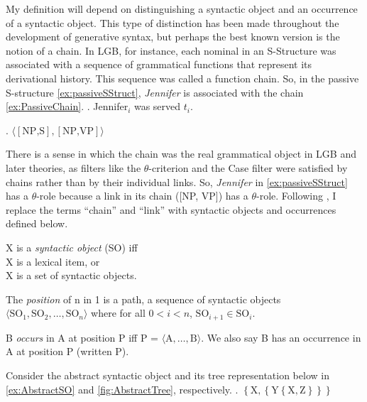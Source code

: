 \documentclass[MilwayThesis]{subfiles}
\begin{document}
My definition will depend on distinguishing a syntactic object and an occurrence of a syntactic object.
This type of distinction has been made throughout the development of generative syntax, but perhaps the best known version is the notion of a chain.
In LGB, for instance, each nominal in an S-Structure was associated with a sequence of grammatical functions that represent its derivational history.
This sequence was called a function chain.
So, in the passive S-structure \cref{ex:passiveSStruct}, \textit{Jennifer} is associated with the chain \cref{ex:PassiveChain}.
\ex.\label{ex:passiveSStruct} Jennifer$_i$ was served $t_i$.

\ex.\label{ex:PassiveChain} $\langle\left[\text{NP,S}\right], \left[\text{NP,VP}\right]\rangle$

There is a sense in which the chain was the real grammatical object in LGB and later theories, as filters like the $\theta$-criterion and the Case filter were satisfied by chains rather than by their individual links.
So, \textit{Jennifer} in \cref{ex:passiveSStruct} has a $\theta$-role because a link in its chain ([NP, VP]) has a $\theta$-role.
Following \textcite{collins2016formalization}, I replace the terms ``chain'' and ``link'' with syntactic objects and occurrences defined below.
\begin{defn}
  X is a \textit{syntactic object} (SO) iff\\
    X is a lexical item, or\\
    X is a set of syntactic objects. \parencite[Modified from][]{collins2016formalization}
  \label{def:so}
\end{defn}
\begin{defn}
  The \textit{position} of n in 1 is a path, a sequence of syntactic objects $\langle\text{SO}_1,\text{SO}_2,\dots,\text{SO}_n\rangle$ where for all $0 < i < n$, $\text{SO}_{i + 1} \in \text{SO}_i$. \parencite{collins2016formalization}
  \label{def:position}
\end{defn}
\begin{defn}
  B \textit{occurs} in A at position P iff P = $\langle\text{A},\dots,\text{B}\rangle$. We also say B has an occurrence in A at position P (written P).
  \label{def:occurrence}
\end{defn}

Consider the abstract syntactic object and its tree representation below in \cref{ex:AbstractSO} and \cref{fig:AbstractTree}, respectively.
\ex.\label{ex:AbstractSO} $\left\{ \text{X}, \left\{ \text{Y} \left\{ \text{X}, \text{Z} \right\} \right\} \right\}$
\end{document}
